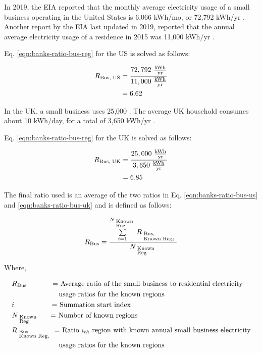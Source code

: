 In 2019, the EIA reported that the monthly average electricity usage of a small business operating in the United States is 6,066 kWh/mo, or 72,792 kWh/yr \cite{us-business}.
Another report by the EIA last updated in 2019, reported that the annual average electricity usage of a residence in 2015 was 11,000 kWh/yr \cite{us-residential}.

Eq. \eqref{eqn:banks-ratio-bus-reg} for the US is solved as follows:

\begin{align}\label{eqn:banks-ratio-bus-us}
  R_\textrm{Bus, US} &= \frac{72,792 \ \tfrac{ \textrm{kWh} } { \textrm{yr} }} {11,000 \ \tfrac{ \textrm{kWh} } { \textrm{yr} }} \\
                     &= 6.62 \nonumber
\end{align}

In the UK, a small business uses 25,000 \cite{uk-business}.
The average UK household consumes about 10 kWh/day, for a total of 3,650 kWh/yr \cite{uk-residential}.

Eq. \eqref{eqn:banks-ratio-bus-reg} for the UK is solved as follows:

\begin{align}\label{eqn:banks-ratio-bus-uk}
  R_\textrm{Bus, UK} &= \frac{25,000 \ \tfrac{ \textrm{kWh} } { \textrm{yr} }} {3,650 \ \tfrac{ \textrm{kWh} } { \textrm{yr} }} \\
                     &= 6.85 \nonumber
\end{align}

The final ratio used is an average of the two ratios in Eq. \eqref{eqn:banks-ratio-bus-us} and \eqref{eqn:banks-ratio-bus-uk} and is defined as follows:

\begin{align}\label{eqn:banks-bus-ratio}
  R_\textrm{Bus} = \dfrac{ \sum\limits_{i=1}^{N_{\begin{subarray}{l} \textrm{ {Known} } \\ \textrm{ {Reg} } \end{subarray} } } R_{\begin{subarray}{l} \textrm{ {Bus,} } \\ \textrm{ {Known Reg$_i$} } \end{subarray} } } { N_{\begin{subarray}{l} \textrm{ {Known} } \\ \textrm{ {Reg} } \end{subarray} } }
\end{align}

Where,

\begin{align*}
&R_\textrm{Bus} \textrm{ \ \ \qquad \ \ = Average ratio of the small business to residential electricity} \\
&\textrm{\ \qquad \qquad \quad \ \ \ \ usage ratios for the known regions} \\
&i \textrm{\ \quad \qquad \qquad = Summation start index} \\
&N_{\begin{subarray}{l} \textrm{ {Known} } \\ \textrm{ {Reg} } \end{subarray} } \textrm{ \quad \ = Number of known regions} \\
&R_{\begin{subarray}{l} \textrm{ {Bus} } \\ \textrm{ {Known Reg$_i$} } \end{subarray} } \textrm{\ = Ratio $i_{th}$ region with known annual small business electricity} \\
&\textrm{\ \qquad \qquad \quad \ \ \ \ usage ratios for the known regions} \\
\end{align*}

